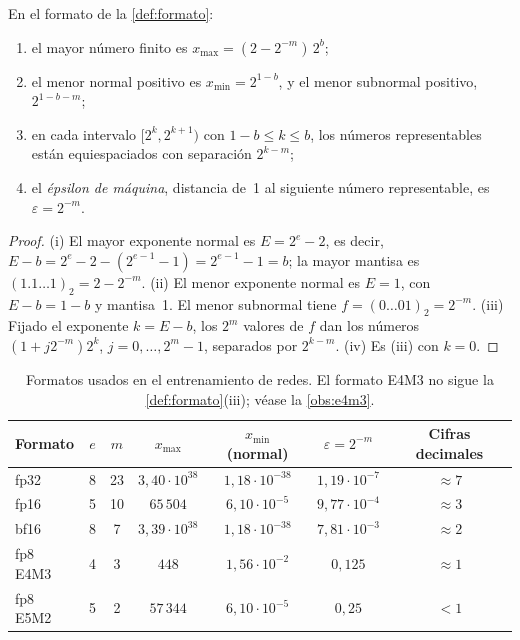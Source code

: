 \begin{proposicion}\label{prop:rango}
En el formato de la \cref{def:formato}:
\begin{enumerate}
  \item el mayor número finito es $x_{\max}=(2-2^{-m})\,2^{b}$;
  \item el menor normal positivo es $x_{\min}=2^{1-b}$, y el menor subnormal positivo, $2^{1-b-m}$;
  \item en cada intervalo $[2^{k},2^{k+1})$ con $1-b\le k\le b$, los números representables están equiespaciados con separación $2^{k-m}$;
  \item el \emph{épsilon de máquina}, distancia de~1 al siguiente número representable, es $\varepsilon=2^{-m}$.
\end{enumerate}
\end{proposicion}

\begin{proof}
(i) El mayor exponente normal es $E=2^{e}-2$, es decir, $E-b=2^{e}-2-(2^{e-1}-1)=2^{e-1}-1=b$; la mayor mantisa es $(1.1\dots1)_2=2-2^{-m}$. (ii) El menor exponente normal es $E=1$, con $E-b=1-b$ y mantisa~1. El menor subnormal tiene $f=(0\dots01)_2=2^{-m}$. (iii) Fijado el exponente $k=E-b$, los $2^{m}$ valores de $f$ dan los números $(1+j2^{-m})2^{k}$, $j=0,\dots,2^{m}-1$, separados por $2^{k-m}$. (iv) Es (iii) con $k=0$.
\end{proof}

\begin{table}[h]
\centering\small
\begin{tabular}{@{}lcccccc@{}}
\toprule
Formato & $e$ & $m$ & $x_{\max}$ & $x_{\min}$ (normal) & $\varepsilon=2^{-m}$ & Cifras decimales \\
\midrule
fp32 & 8 & 23 & $3{,}40\cdot 10^{38}$ & $1{,}18\cdot 10^{-38}$ & $1{,}19\cdot 10^{-7}$ & $\approx 7$ \\
fp16 & 5 & 10 & $65\,504$ & $6{,}10\cdot 10^{-5}$ & $9{,}77\cdot 10^{-4}$ & $\approx 3$ \\
bf16 & 8 & 7 & $3{,}39\cdot 10^{38}$ & $1{,}18\cdot 10^{-38}$ & $7{,}81\cdot 10^{-3}$ & $\approx 2$ \\
fp8 E4M3 & 4 & 3 & $448$ & $1{,}56\cdot 10^{-2}$ & $0{,}125$ & $\approx 1$ \\
fp8 E5M2 & 5 & 2 & $57\,344$ & $6{,}10\cdot 10^{-5}$ & $0{,}25$ & $<1$ \\
\bottomrule
\end{tabular}
\caption{Formatos usados en el entrenamiento de redes. El formato E4M3 no sigue la \cref{def:formato}(iii); véase la \cref{obs:e4m3}.}
\label{tab:formatos}
\end{table}

